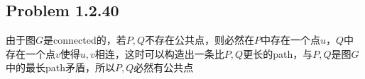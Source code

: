 \subsection*{Problem 1.2.40}
由于图$G$是connected的，若$P, Q$不存在公共点，则必然在$P$中存在一个点$u$，$Q$中存在一个点$v$使得$u, v$相连，这时可以构造出一条比$P, Q$更长的path，与$P, Q$是图$G$中的最长path矛盾，所以$P, Q$必然有公共点

